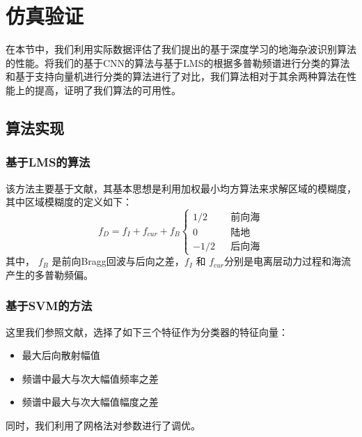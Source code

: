 \section{仿真验证}
在本节中，我们利用实际数据评估了我们提出的基于深度学习的地海杂波识别算法的性能。将我们的基于CNN的算法与基于LMS\cite{turley2013high}的根据多普勒频谱进行分类的算法和基于支持向量机进行分类的算法\cite{jin2012svm}进行了对比，我们算法相对于其余两种算法在性能上的提高，证明了我们算法的可用性。
\subsection{算法实现}
\subsubsection{基于LMS的算法}
该方法主要基于文献\cite{turley2013high}，其基本思想是利用加权最小均方算法来求解区域的模糊度，其中区域模糊度的定义如下：
\begin{equation}
	f_D = f_I + f_{cur} + f_B\left\{
		\begin{array}{rcl}
		1/2       &      & \text{前向海}\\
		0     &      & \text{陆地}\\
		-1/2       &      & \text{后向海}
		\end{array} \right.
\end{equation}
其中， $f_B$ 是前向Bragg回波与后向之差，$f_I$ 和 $f_{cur}$分别是电离层动力过程和海流产生的多普勒频偏。

\subsubsection{基于SVM的方法}
这里我们参照文献\cite{jin2012svm}，选择了如下三个特征作为分类器的特征向量：
\begin{itemize}
	\item 最大后向散射幅值
	\item 频谱中最大与次大幅值频率之差
	\item 频谱中最大与次大幅值幅度之差
\end{itemize}
同时，我们利用了网格法对参数进行了调优。

